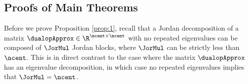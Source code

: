 \subsection{Proofs of Main Theorems}

Before we prove Proposition \ref{prop:1}, recall that a Jordan decomposition of a matrix $\dualopApprox\in\R^{\ncent\times\ncent}$ with no repeated eigenvalues can be composed of $\JorMul$ Jordan blocks, where $\JorMul$ can be strictly less than $\ncent$. This is in direct contrast to the case where the matrix $\dualopApprox$ has an eigenvalue decomposition, in which case no repeated eigenvalues implies that $\JorMul = \ncent$.  
